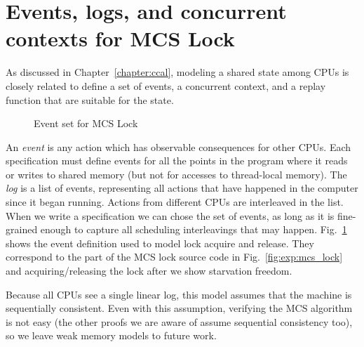 \section{Events, logs, and concurrent contexts for MCS Lock}
\label{subsec:eventlogandoracle}

As discussed in Chapter~\ref{chapter:ccal}, 
modeling a shared state among CPUs is 
closely related to define a set of events, a concurrent context, and a replay function that are suitable for
the state.


\begin{figure}
\begin{minipage}{\linewidth}

\end{minipage}
\caption{Event set for MCS Lock}
\label{fig:lock_event_type}
\end{figure}

An \emph{event} is any action which has observable consequences for
other CPUs. Each specification must define events for all the points
in the program where it reads or writes to shared memory (but not for
accesses to thread-local memory). The \emph{log} is a list of
events, representing all actions that have happened in the computer
since it began running. Actions from different CPUs are interleaved in
the list.
When we write a specification we can chose the set of events, as long
as it is fine-grained enough to capture all scheduling interleavings
that may happen.
Fig.~\ref{fig:lock_event_type} shows the event definition used to
model lock acquire and release. They correspond to the part of the MCS lock source code in Fig.~\ref{fig:exp:mcs_lock}
and acquiring/releasing the lock after we show starvation freedom. 

Because all CPUs see a single linear log, this model assumes that the
machine is sequentially consistent. Even with this assumption,
verifying the MCS algorithm is not easy (the other proofs we are aware
of assume sequential consistency too), so we leave weak memory models
to future work.

